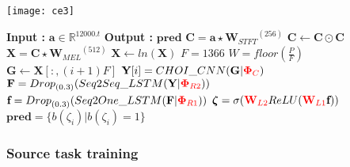 \begin{algorithm}
\begin{minipage}{0.15\textwidth}
\texttt{[image: ce3]}
\end{minipage}
  \begin{minipage}{0.80\textwidth}
  \caption{$\textbf{pred}$ = $Model$($\textbf{a}$) }\label{exp:a4}
   {\fontsize{8}{0}
  \begin{algorithmic}[1]
    \Statex \textbf{Input :} $\textbf{a} \in \mathbb{R}^{12000.t}$
    \Statex \textbf{Output :} $\textbf{pred}$ 
    \State $\textbf{C} = \textbf{a} \star {\textbf{W}_{STFT}}^{(256)}$ 
    \State $\textbf{C} \leftarrow \textbf{C} \odot \textbf{C}$
    \State $\textbf{X} = \textbf{C} \star {\textbf{W}_{MEL}}^{(512)}$ 
    \State $\textbf{X} \leftarrow ln(\textbf{X})$
    \State $F = 1366$
    \State $W = floor(\frac{P}{F})$
      \State $ \textbf{G} \leftarrow \textbf{X}[:,(i+1)F]$
      \State $\textbf{Y}[i] = CHOI\_CNN(\textbf{G} | {\color{red} \bm{\Phi}_{C}})$ 
     \EndFor
     \State $\textbf{F} = {Drop}_{(0.3)}(Seq2Seq\_LSTM(\textbf{Y} | {\color{red}\bm{\Phi}_{R2}} ))$ 
    \State $\textbf{f} = {Drop}_{(0.3)}(Seq2One\_LSTM(\textbf{F} | {\color{red}\bm{\Phi}_{R1}}))$ 
    \State $\bm{\zeta} = \sigma ({\color{red} \textbf{W}_{L2}} ReLU ({\color{red}\textbf{W}_{L1}}\textbf{f})) $ 
    \State $\textbf{pred} = \{ b(\zeta_{i}) | b(\zeta_{i}) = 1 \}$ 
  \end{algorithmic}
  }
  \end{minipage}
\end{algorithm}
\FloatBarrier

\subsubsection{Source task training}

